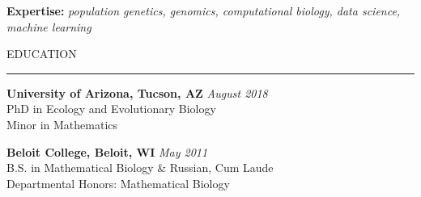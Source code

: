 \documentclass{resume} %
\renewenvironment{rSection}[1]{
\sectionskip
\textcolor{RoyalPurple}{\MakeUppercase{#1}}
\sectionlineskip
\hrule
\begin{list}{}{
\setlength{\leftmargin}{1.5em}
}
\item[]
}{
\end{list}
}
\begin{document}
\textcolor{RoyalPurple}{\bf Expertise:}
\textcolor{RoyalPurple}{\em population genetics, genomics, computational biology, data science, machine learning}



\begin{rSection}{Education}

{\bf University of Arizona, Tucson, AZ} \hfill {\em August 2018} \\ 
PhD in Ecology and Evolutionary Biology \\
Minor in Mathematics 

{\bf Beloit College, Beloit, WI} \hfill {\em May 2011} \\ 
B.S. in Mathematical Biology \& Russian, Cum Laude \\
Departmental Honors: Mathematical Biology

\end{rSection}

\end{document}
